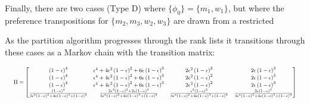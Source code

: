\documentclass[WP]{AEA}
\begin{document}
Finally, there are two cases (Type D) where $\{\phi_0\}=\{m_1,w_1\}$, but where the preference transpositions for  $\{m_2,m_3,w_2,w_3\}$ are drawn from a restricted 

As the partition algorithm progresses through the rank lists it transitions through these cases as a Markov chain with the transition matrix:


 \begin{equation*}
 	\resizebox{\textwidth}{!}{
$	\Pi = 
	\left[
		\begin{matrix}
			\left(1 - \epsilon\right)^{4} & \epsilon^{4} + 4 \epsilon^{2} \left(1 - \epsilon\right)^{2} + 6 \epsilon \left(1 - \epsilon\right)^{3} & 2 \epsilon^{2} \left(1 - \epsilon\right)^{2} & 2 \epsilon \left(1 - \epsilon\right)^{3}\\\left(1 - \epsilon\right)^{4} & \epsilon^{4} + 4 \epsilon^{2} \left(1 - \epsilon\right)^{2} + 6 \epsilon \left(1 - \epsilon\right)^{3} & 2 \epsilon^{2} \left(1 - \epsilon\right)^{2} & 2 \epsilon \left(1 - \epsilon\right)^{3}\\\left(1 - \epsilon\right)^{4} & \epsilon^{4} + 4 \epsilon^{2} \left(1 - \epsilon\right)^{2} + 6 \epsilon \left(1 - \epsilon\right)^{3} & 2 \epsilon^{2} \left(1 - \epsilon\right)^{2} & 2 \epsilon \left(1 - \epsilon\right)^{3}\\\frac{\left(1 - \epsilon\right)^{4}}{3 \epsilon^{2} \left(1 - \epsilon\right)^{2} + 4 \epsilon \left(1 - \epsilon\right)^{3} + \left(1 - \epsilon\right)^{4}} & \frac{2 \epsilon^{2} \left(1 - \epsilon\right)^{2} + 2 \epsilon \left(1 - \epsilon\right)^{3}}{3 \epsilon^{2} \left(1 - \epsilon\right)^{2} + 4 \epsilon \left(1 - \epsilon\right)^{3} + \left(1 - \epsilon\right)^{4}} & \frac{\epsilon^{2} \left(1 - \epsilon\right)^{2}}{3 \epsilon^{2} \left(1 - \epsilon\right)^{2} + 4 \epsilon \left(1 - \epsilon\right)^{3} + \left(1 - \epsilon\right)^{4}} & \frac{2 \epsilon \left(1 - \epsilon\right)^{3}}{3 \epsilon^{2} \left(1 - \epsilon\right)^{2} + 4 \epsilon \left(1 - \epsilon\right)^{3} + \left(1 - \epsilon\right)^{4}}
		\end{matrix}
	\right] 
	$
}
\end{equation*}
\end{document}
